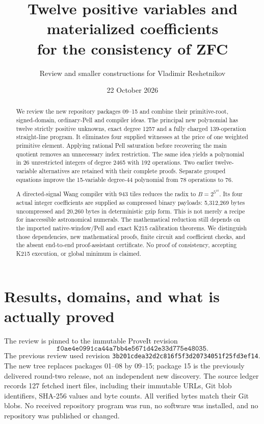 \documentclass[11pt]{article}
\title{Twelve positive variables and materialized coefficients\\for the consistency of ZFC}
\author{Review and smaller constructions for Vladimir Reshetnikov}
\date{22 October 2026}
\begin{document}
\maketitle
\begin{abstract}
We review the new repository packages 09--15 and combine their primitive-root, signed-domain, ordinary-Pell and compiler ideas. The principal new polynomial has twelve strictly positive unknowns, exact degree 1257 and a fully charged 139-operation straight-line program. It eliminates four supplied witnesses at the price of one weighted primitive element. Applying rational Pell saturation before recovering the main quotient removes an unnecessary index restriction. The same idea yields a polynomial in 26 unrestricted integers of degree 2465 with 192 operations. Two earlier twelve-variable alternatives are retained with their complete proofs. Separate grouped equations improve the 15-variable degree-44 polynomial from 78 operations to 76.

A directed-signal Wang compiler with 943 tiles reduces the radix to $B=2^{5^{10}}$. Its four actual integer coefficients are supplied as compressed binary payloads: 5,312,269 bytes uncompressed and 20,260 bytes in deterministic gzip form. This is not merely a recipe for inaccessible astronomical numerals. The mathematical reduction still depends on the imported native-window/Pell and exact K215 calibration theorems. We distinguish those dependencies, new mathematical proofs, finite circuit and coefficient checks, and the absent end-to-end proof-assistant certificate. No proof of consistency, accepting K215 execution, or global minimum is claimed.
\end{abstract}

\section{Results, domains, and what is actually proved}

The review is pinned to the immutable ProveIt revision
\[
\texttt{f0ae4e0991ca44a7bb4e5671d42e33d775e48035}.
\]
The previous review used revision
\texttt{3b201cdea32d2c816f5f3d20734051f25fd3ef14}.
The new tree replaces packages 01--08 by 09--15; package 15 is the previously delivered round-two release, not an independent new discovery. The source ledger records 127 fetched inert files, including their immutable URLs, Git blob identifiers, SHA-256 values and byte counts. All verified bytes match their Git blobs. No received repository program was run, no software was installed, and no repository was published or changed.
\end{document}
